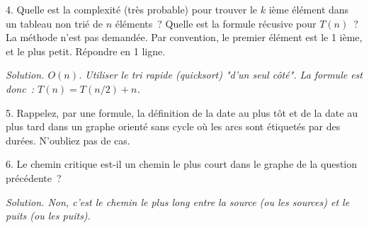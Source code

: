 \documentclass[11pt]{article}
\newcommand{\comment}[1]{}
\begin{document}
 
4.  Quelle est la complexité (très probable) pour trouver le $k$ ième élément
dans un tableau non trié de $n$ éléments~? Quelle est la formule récusive pour $T(n)$~? La méthode n'est pas demandée.
Par convention, le premier élément est le 1 ième, et le plus petit. 
Répondre en 1 ligne.

 
\ifcorrige
{\it Solution. $O(n)$. Utiliser le tri rapide (quicksort) "d'un seul côté".
La formule est donc~: $T(n)=T(n/2)+n$.
}
\else
\fi

\comment{
5. Peut-on utiliser l'algorithme de Dijkstra quand les arcs portent des coûts négatifs~? Même question pour l'algorithme de  Ford (ou Ford-Bellman, ou Bellman-Ford, ou Bellman–Ford–Moore\footnote{En fait, Alfonso Shimbel l'a proposé avant, en 1955 [Wikipedia].})~? %
\ifcorrige
{\it Solution. Non pour Dijkstra. Oui pour Ford.}
\else
\fi
}


\comment{
6. Un graphe orienté a des arcs étiquetés avec des coûts négatifs. Existe-t-il forcément des circuits de coût global négatif~? Si oui, prouvez-le~; sinon, prouvez-le.
%
\ifcorrige
{\it Solution. Non, pas forcément. Un contre-exemple suffit pour le prouver. Le graphe qui ne contient que l'arc~: $a\rightarrow b$ de coût $-1$ n'a pas de cycle donc pas de cycle de coût global négatif. Autre contre-exemple~: le graphe avec deux arcs~: $a\rightarrow b$ de coût $-1$ et $b\rightarrow a$ de coût 2. 
}
\else
\fi
}
 
5. Rappelez, par une formule, la définition de la date au plus tôt et de la date au plus tard dans un graphe orienté sans cycle où les arcs sont étiquetés par des durées. N'oubliez pas de cas.  %

\else
\fi

 
6. Le chemin critique est-il un chemin le plus court dans le graphe de la question précédente~?

\ifcorrige
{\it Solution. Non, c'est le chemin le plus long entre la source (ou les sources) et le puits (ou les puits).
}
\else
\fi
\end{document}
